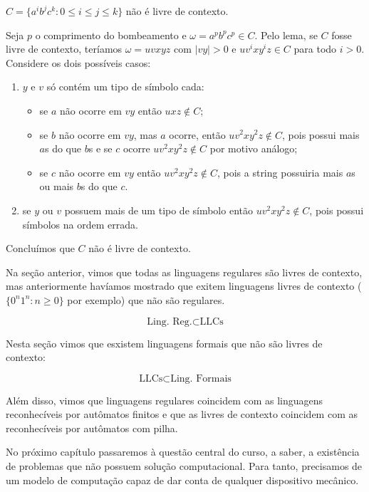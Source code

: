 \begin{example}
  $C = \{a^ib^jc^k : 0 \leq i \leq j \leq k\}$ não é livre de contexto.

  Seja $p$ o comprimento do bombeamento e $\omega = a^pb^pc^p \in C$.
  Pelo lema, se $C$ fosse livre de contexto, teríamos $\omega = uvxyz$ com $|vy| > 0$ e $uv^ixy^iz \in C$ para todo $i > 0$.
  Considere os dois possíveis casos:

  \begin{enumerate}
  \item $y$ e $v$ só contém um tipo de símbolo cada:
    \begin{itemize}
    \item se $a$ não ocorre em $vy$ então $uxz \notin C$;
    \item se $b$ não ocorre em $vy$, mas $a$ ocorre, então $uv^2xy^2z \notin C$, pois possui mais $a$s do que $b$s e se $c$ ocorre $uv^2xy^2z \notin C$ por motivo análogo;
    \item se $c$ não ocorre em $vy$ então $uv^2xy^2z \notin C$, pois a string possuiria mais $a$s ou mais $b$s do que $c$.
    \end{itemize}
  \item se $y$ ou $v$ possuem mais de um tipo de símbolo então $uv^2xy^2z \notin C$, pois possui símbolos na ordem errada.
  \end{enumerate}
  Concluímos que $C$ não é livre de contexto.
\end{example}

Na seção anterior, vimos que todas as linguagens regulares são livres de contexto, mas anteriormente havíamos mostrado que exitem linguagens livres de contexto ($\{0^n1^n: n \geq 0\}$ por exemplo) que não são regulares.

\begin{displaymath}
  \textrm{Ling. Reg.} \subset \textrm{LLCs}
\end{displaymath}

Nesta seção vimos que esxistem linguagens formais que não são livres de contexto:

\begin{displaymath}
  \textrm{LLCs} \subset \textrm{Ling. Formais}
\end{displaymath}

Além disso, vimos que linguagens regulares coincidem com as linguagens reconhecíveis por autômatos finitos e que as livres de contexto coincidem com as reconhecíveis por autômatos com pilha.

No próximo capítulo passaremos à questão central do curso, a saber, a existência de problemas que não possuem solução computacional.
Para tanto, precisamos de um modelo de computação capaz de dar conta de qualquer dispositivo mecânico.
